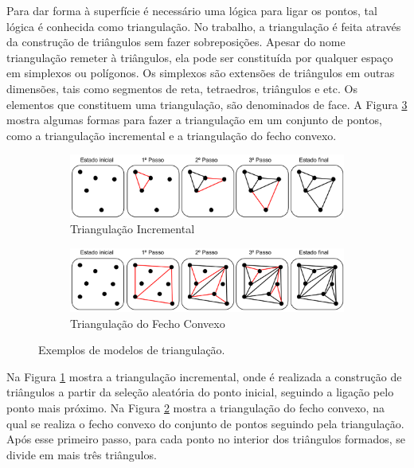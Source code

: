 Para dar forma à superfície é necessário uma lógica para ligar os pontos, tal lógica é conhecida como triangulação.
No trabalho, a triangulação é feita através da construção de triângulos sem fazer sobreposições. 
Apesar do nome triangulação remeter à triângulos, ela pode ser constituída por qualquer espaço em simplexos ou polígonos. 
Os simplexos são extensões de triângulos em outras dimensões, tais como segmentos de reta, tetraedros, triângulos e etc. 
Os elementos que constituem uma triangulação, são denominados de face.
A Figura \ref{fig:triangulation} mostra algumas formas para fazer a triangulação em um conjunto de pontos, como a triangulação incremental e a triangulação do fecho convexo.

\begin{figure}[H]
    \centering
    \begin{subfigure}[t]{0.9\textwidth}
        \includegraphics[width=\textwidth]{dados/figuras/triangulation_incremental.png}
        \caption{Triangulação Incremental}
        \label{fig:incremental_triangulation}
        \vspace{1em}
    \end{subfigure}
    \begin{subfigure}[t]{0.9\textwidth}
        \includegraphics[width=\textwidth]{dados/figuras/triangulation_convex.png}
        \caption{Triangulação do Fecho Convexo}
        \label{fig:convex_triangulation}
    \end{subfigure}
    \caption{Exemplos de modelos de triangulação.}
    \label{fig:triangulation}
\end{figure}

Na Figura \ref{fig:incremental_triangulation} mostra a triangulação incremental, onde é realizada a construção de triângulos a partir da seleção aleatória do ponto inicial, seguindo a ligação pelo ponto mais próximo. 
Na Figura \ref{fig:convex_triangulation} mostra a triangulação do fecho convexo, na qual se realiza o fecho convexo do conjunto de pontos seguindo pela triangulação.
Após esse primeiro passo, para cada ponto no interior dos triângulos formados, se divide em mais três triângulos.

